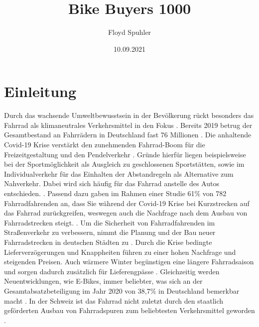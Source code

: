 \documentclass[usegeometry=true]{scrartcl}
\begin{document}
\subject{Projektbericht zum Modul Information Retrieval und Visualisierung Sommersemester 2021}

\title{Bike Buyers 1000}
\author{Floyd Spuhler}%
\date{10.09.2021}
\maketitle%
\newpage
\tableofcontents
\newpage
\section{Einleitung}
Durch das wachsende Umweltbewusstsein in der Bevölkerung rückt besonders das Fahrrad als klimaneutrales Verkehrsmittel in den Fokus \cite{Marquart.2021}. Bereits 2019 betrug der Gesamtbestand an Fahrrädern in Deutschland fast 76 Millionen \cite{Kords.26.06.2020,Statista.25.08.2021}. Die anhaltende Covid-19 Krise verstärkt den zunehmenden Fahrrad-Boom für die Freizeitgestaltung und den Pendelverkehr \cite{Platter.2020}. Gründe hierfür liegen beispielsweise bei der Sportmöglichkeit als Ausgleich zu geschlossenen Sportstätten, sowie im Individualverkehr für das Einhalten der Abstandregeln als Alternative zum Nahverkehr. Dabei wird sich häufig für das Fahrrad anstelle des Autos entschieden. \cite{Kollner.30.12.2020,Thomannbusse.24.11.2020}. Passend dazu gaben im Rahmen einer Studie 61\%  von 782 Fahrradfahrenden an, dass Sie während der Covid-19 Krise bei Kurzstrecken auf das Fahrrad zurückgreifen, weswegen auch die Nachfrage nach dem Ausbau von Fahrradstrecken steigt. \cite{sinus.2021}. Um die Sicherheit von Fahrradfahrenden im Straßenverkehr zu verbessern, nimmt die Planung und der Bau neuer Fahrradstrecken in deutschen Städten zu \cite{sinus.2021,ADAC.05.09.2021,Muenchen.de.05.09.2021}. Durch die Krise bedingte Lieferverzögerungen und Knappheiten führen zu einer hohen Nachfrage und steigenden Preisen. Auch wärmere Winter begünstigen eine längere Fahrradsaison und sorgen dadurch zusätzlich für Lieferengpässe \cite{tagesschau.11.03.2021}. Gleichzeitig werden Neuentwicklungen, wie E-Bikes, immer beliebter, was sich an der Gesamtabsatzbeteiligung im Jahr 2020 von 38,7\% in Deutschland bemerkbar macht \cite{tagesschau.11.03.2021}. 
In der Schweiz ist das Fahrrad nicht zuletzt durch den staatlich geförderten Ausbau von Fahrradspuren zum beliebtesten Verkehrsmittel geworden \cite{Platter.2020}.
\end{document}
